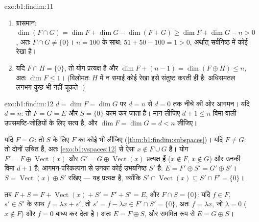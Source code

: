 \begin{solution}{exo:b1:findim:11}
\begin{enumerate}
  \item ग्रासमान: $\dim(F \cap G) = \dim F + \dim G - \dim(F + G) \geq \dim
  F + \dim G - n > 0$, अतः $F \cap G \neq \{0\}$। $n = 100$ के साथ: $51 + 50
  - 100 = 1 > 0$, अर्थात् सर्वनिष्ठ में कोई रेखा है।
  \item यदि $F \cap H = \{0\}$, तो योग प्रत्यक्ष है और $\dim F + (n - 1) =
  \dim(F \oplus H) \leq n$, अतः $\dim F \leq 1$। (विलोमतः $H$ में न समाई कोई
  रेखा इसे संतुष्ट करती ही है: अधिसमतल लगभग कुछ भी नहीं चूकते।)
\end{enumerate}
\end{solution}

\begin{solution}{exo:b1:findim:12}
$d = \dim F = \dim G$ पर $d = n$ से $d = 0$ तक नीचे की ओर आगमन। यदि $d = n$:
तो $F = G = E$ और $S = \{0\}$ काम कर जाता है। मान लीजिए  $d + 1 \leq n$
विमा वाली उपसमष्टि-जोड़ियों के लिए सत्य है, और $\dim F = \dim G = d < n$
लीजिए।

यदि $F = G$: तो $S$ के लिए $F$ का कोई भी  लीजिए
(\cref{thm:b1:findim:subspaces})। यदि $F \neq G$: तो दोनों उचित हैं, अतः
\cref{exo:b1:vspaces:12} से ऐसा $x \notin F \cup G$ है। योग $F' = F \oplus
\operatorname{Vect}(x)$ और $G' = G \oplus \operatorname{Vect}(x)$ प्रत्यक्ष
हैं ($x \notin F$, $x \notin G$) और उनकी विमा $d + 1$ है; आगमन-परिकल्पना से
उनका कोई उभयनिष्ठ  $S'$ है: $E = F' \oplus S' = G' \oplus S'$। $S =
\operatorname{Vect}(x) \oplus S'$ रखिए --- यह प्रत्यक्ष है, क्योंकि $S' \cap
\operatorname{Vect}(x) \subseteq S' \cap F' = \{0\}$।

तब $F + S = F + \operatorname{Vect}(x) + S' = F' + S' = E$, और $F \cap S =
\{0\}$: यदि $f \in F$, $s' \in S'$ के साथ $f = \lambda x + s'$, तो $s' = f -
\lambda x \in F' \cap S' = \{0\}$, अतः $f = \lambda x$, जो $\lambda = 0$ ($x
\notin F$) और $f = 0$ बाध्य कर देता है। अतः $E = F \oplus S$, और सममित रूप
से $E = G \oplus S$।
\end{solution}


